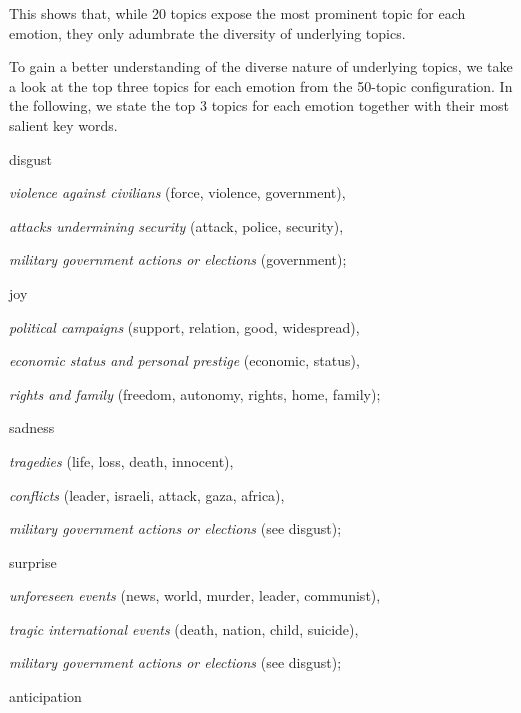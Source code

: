 This shows that, while 20 topics expose the most prominent topic for each emotion, they only adumbrate the diversity of underlying topics.

To gain a better understanding of the diverse nature of underlying topics, we take a look at the top three topics for each emotion from the 50-topic configuration. In the following, we state the top 3 topics for each emotion together with their most salient key words.
\begin{aenumerate}
	\item disgust
	\begin{aenumerate}
		\item \textit{violence against civilians} (force, violence, government),
		\item \textit{attacks undermining security} (attack, police, security),
		\item \textit{military government actions or elections} (government);
	\end{aenumerate}
	\item joy
	\begin{aenumerate}
		\item \textit{political campaigns} (support, relation, good, widespread),
		\item \textit{economic status and personal prestige} (economic, status),
		\item \textit{rights and family} (freedom, autonomy, rights, home, family);
	\end{aenumerate}
	\item sadness
	\begin{aenumerate}
		\item \textit{tragedies} (life, loss, death, innocent),
		\item \textit{conflicts} (leader, israeli, attack, gaza, africa),
		\item \textit{military government actions or elections} (see disgust);
	\end{aenumerate}
	\item surprise
	\begin{aenumerate}
		\item \textit{unforeseen events} (news, world, murder, leader, communist),
		\item \textit{tragic international events} (death, nation, child, suicide),
		\item \textit{military government actions or elections} (see disgust);
	\end{aenumerate}
	\item anticipation

\end{aenumerate}
